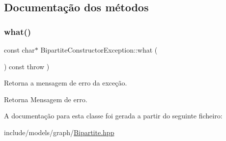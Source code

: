 \subsection{Documentação dos métodos}
\mbox{\label{classBipartiteConstructorException_a11f033387020957b5ccd952914475807}} 
\subsubsection{\texorpdfstring{what()}{what()}}
{\footnotesize\ttfamily const char$\ast$ Bipartite\+Constructor\+Exception\+::what (\begin{DoxyParamCaption}{ }\end{DoxyParamCaption}) const throw  ) \hspace{0.3cm}{\ttfamily [inline]}}

Retorna a mensagem de erro da exceção. \begin{DoxyReturn}{Retorna}
Mensagem de erro. 
\end{DoxyReturn}


A documentação para esta classe foi gerada a partir do seguinte ficheiro\+:\begin{DoxyCompactItemize}
\item 
include/models/graph/\hyperlink{Bipartite_8hpp}{Bipartite.\+hpp}\end{DoxyCompactItemize}
